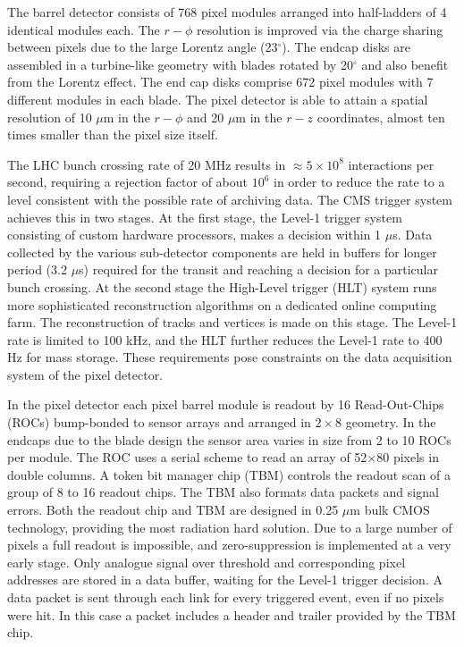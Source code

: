 The barrel detector consists of 768 pixel modules arranged into half-ladders of 4 identical modules
each. The $r-\phi$ resolution is improved via the charge sharing between pixels due to 
the large Lorentz angle (23$^\circ$).
The endcap disks are assembled in a turbine-like geometry with blades rotated by 20$^\circ$
and also benefit from the Lorentz effect. The end cap disks comprise 672 pixel modules 
with 7 different modules in each blade.
The pixel detector is able to attain a spatial 
resolution of 10 $\mu$m in the $r-\phi$ and 20 $\mu$m in the $r-z$ coordinates, 
almost ten times smaller than the pixel size itself.

The LHC bunch crossing rate of 20 MHz results in $\approx 5 \times 10^8$ interactions per second, 
requiring a rejection factor of about $10^6$ in order to reduce the rate to a level consistent 
with the possible rate of archiving data. The CMS trigger system achieves this in two stages. 
At the first stage, the Level-1 trigger system consisting of custom hardware processors,
makes a decision within 1 $\mu$s. 
Data collected by the various sub-detector components are held in buffers for longer period (3.2 $\mu$s)
required for the transit and reaching a decision for a particular bunch crossing. 
At the second stage the High-Level trigger (HLT) system 
runs more sophisticated reconstruction algorithms on a dedicated online computing farm. 
The reconstruction of tracks and vertices is made on this stage.
The Level-1 rate is limited to 100 kHz, and the HLT further reduces the Level-1 rate to 400 Hz 
for mass storage. These requirements pose constraints on the data acquisition system of the pixel 
detector.

In the pixel detector 
each pixel barrel module is readout by 16 Read-Out-Chips (ROCs)
bump-bonded to sensor arrays and 
arranged in $2\times8$ geometry.
In the endcaps due to the blade design the sensor area varies  in size 
from 2 to 10 ROCs per module.
The ROC uses a serial scheme to read an array of 52$\times$80 pixels in double columns.
A token bit manager chip (TBM) controls the readout scan of a group of 8 to 16 readout chips.
The TBM also formats data packets and signal errors.  
Both the readout chip and TBM are designed in 0.25 $\mu$m bulk CMOS technology, 
providing the most radiation hard solution.
Due to a large number of pixels a full readout is impossible, and zero-suppression 
is implemented at a very early stage.
Only analogue signal over threshold and corresponding pixel addresses are stored in a data buffer, 
waiting for the Level-1 trigger decision. 
A data packet is sent through each link for every triggered event, even if no pixels were hit.
In this case a packet includes a header and trailer provided by the TBM chip. 

